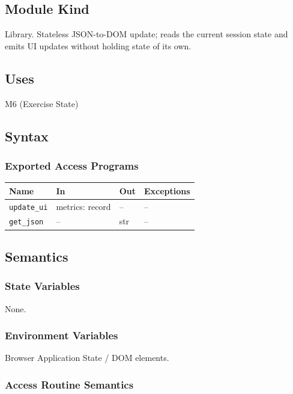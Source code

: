 \documentclass[12pt, titlepage]{article}
\begin{document}
\subsection{Module Kind}
Library. Stateless JSON-to-DOM update; reads the current session
state and emits UI updates without holding state of its own.

\subsection{Uses}
M6 (Exercise State)

\subsection{Syntax}

\subsubsection{Exported Access Programs}

\begin{center}
\begin{tabular}{p{3.5cm} p{4.5cm} p{2cm} p{2cm}}
\hline
\textbf{Name} & \textbf{In} & \textbf{Out} & \textbf{Exceptions} \\
\hline
\texttt{update\_ui} & metrics: record & -- & -- \\
\texttt{get\_json} & -- & str & -- \\
\hline
\end{tabular}
\end{center}

\subsection{Semantics}

\subsubsection{State Variables}
None.

\subsubsection{Environment Variables}
Browser Application State / DOM elements.

\subsubsection{Access Routine Semantics}
\end{document}
